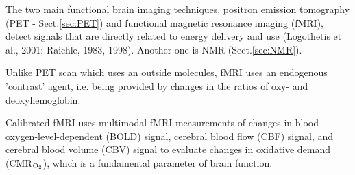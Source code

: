 The two main functional brain imaging techniques, positron emission tomography
(PET - Sect.\ref{sec:PET}) and functional magnetic resonance imaging (fMRI),
detect signals that are directly related to energy delivery and use (Logothetis
et al., 2001; Raichle, 1983, 1998). Another one is NMR (Sect.\ref{sec:NMR}).

Unlike PET scan which uses an outside molecules, fMRI uses an endogenous
'contrast' agent, i.e. being provided by changes in the ratios of oxy- and
deoxyhemoglobin.

Calibrated fMRI uses multimodal fMRI measurements of changes in
blood-oxygen-level-dependent (BOLD) signal, cerebral blood flow (CBF) signal,
and cerebral blood volume (CBV) signal to evaluate changes in oxidative demand
(CMR$_{\ce{O2}}$), which is a fundamental parameter of brain function.


